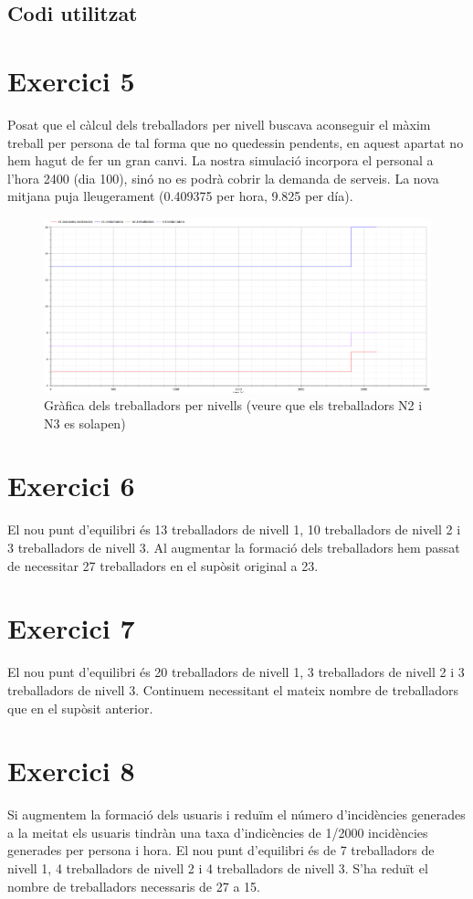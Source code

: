 \documentclass[11pt,a4paper,twoside]{report}
\begin{document}
\subsection{Codi utilitzat}


\section{Exercici 5}
Posat que el càlcul dels treballadors per nivell buscava aconseguir el màxim treball per persona de tal forma que no quedessin pendents, en aquest apartat no hem hagut de fer un gran canvi.
La nostra simulació incorpora el personal a l'hora 2400 (dia 100), sinó no es podrà cobrir la demanda de serveis.
La nova mitjana puja lleugerament (0.409375 per hora, 9.825 per día).
\begin{figure}[h!]
  \includegraphics[width=\linewidth]{ex5.png}
  \caption{Gràfica dels treballadors per nivells (veure que els treballadors N2 i N3 es solapen)}
  \label{fig:plot1}
\end{figure}

\section{Exercici 6}
El nou punt d'equilibri és 13 treballadors de nivell 1, 10 treballadors de nivell 2 i 3 treballadors de nivell 3.
\newline Al augmentar la formació dels treballadors hem passat de necessitar 27 treballadors en el supòsit original a 23.

\section{Exercici 7}
El nou punt d'equilibri és 20 treballadors de nivell 1, 3 treballadors de nivell 2 i 3 treballadors de nivell 3.
\newline Continuem necessitant el mateix nombre de treballadors que en el supòsit anterior.

\section{Exercici 8}
Si augmentem la formació dels usuaris i reduïm el número d'incidències generades a la meitat els usuaris tindràn una taxa d'indicències de 1/2000 incidències generades per persona i hora.
\newline El nou punt d'equilibri és de 7 treballadors de nivell 1, 4 treballadors de nivell 2 i 4 treballadors de nivell 3.
S'ha reduït el nombre de treballadors necessaris de 27 a 15.
\end{document}
